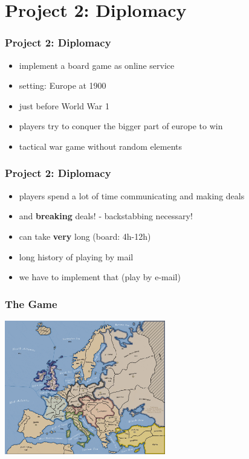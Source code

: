\documentclass{beamer}
\begin{document}
\section{Project 2: Diplomacy}

\begin{frame}
  \frametitle{Project 2: Diplomacy}
  \begin{itemize}
    \item implement a board game as online service \pause
    \item setting: Europe at 1900
    \item just before World War 1
    \item players try to conquer the bigger part of europe to win
    \item tactical war game without random elements
  \end{itemize}
\end{frame}

\begin{frame}
  \frametitle{Project 2: Diplomacy}
  \begin{itemize}
    \item players spend a lot of time communicating and making deals \pause
    \item and {\bf breaking} deals! - backstabbing necessary!
    \item can take {\bf very} long (board: 4h-12h)
    \item long history of playing by mail \pause
    \item we have to implement that (play by e-mail)
  \end{itemize}
\end{frame}

\begin{frame}
  \frametitle{The Game}
  \begin{center}
    \includegraphics[width=7cm]{images/diplomacy/board.jpg}
  \end{center}
\end{frame}
\end{document}
